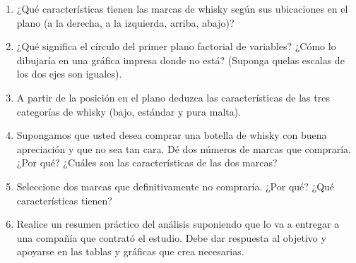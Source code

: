 \documentclass[letterpaper, 12pt]{article}
\begin{document}
\begin{enumerate}
        \item ¿Qué características tienen las marcas de whisky según sus 
        ubicaciones en el plano (a la derecha, a la izquierda, arriba, abajo)?
        
        \item ¿Qué significa el círculo del primer plano factorial de 
        variables? ¿Cómo lo dibujaría en una gráfica impresa donde no está? 
        (Suponga quelas escalas de los dos ejes son iguales).
        
        \item A partir de la posición en el plano deduzca las características 
        de las tres categorías de whisky (bajo, estándar y pura malta).
        
        \item Supongamos que usted desea comprar una botella de whisky con 
        buena apreciación y que no sea tan cara. Dé dos números de marcas que
        compraría. ¿Por qué? ¿Cuáles son las características de las dos marcas?
        
        \item Seleccione dos marcas que definitivamente no compraría. 
        ¿Por qué? ¿Qué características tienen?
        
        \item Realice un resumen práctico del análisis suponiendo que lo va
        a entregar a una compañía que contrató el estudio. Debe dar respuesta al
        objetivo y apoyarse en las tablas y gráficas que crea necesarias.
        

\end{enumerate}
\end{document}
